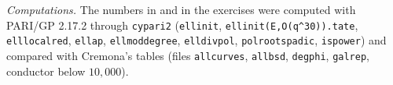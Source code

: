 \emph{Computations.} The numbers in  and in the exercises were computed with PARI/GP \cite{PARI}
2.17.2 through \texttt{cypari2} (\texttt{ellinit}, \texttt{ellinit(E,O(q\^{}30)).tate}, \texttt{elllocalred}, \texttt{ellap}, \texttt{ellmoddegree}, \texttt{elldivpol},
\texttt{polrootspadic}, \texttt{ispower}) and compared with Cremona's tables \cite{Cremona97} (files \texttt{allcurves}, \texttt{allbsd}, \texttt{degphi}, \texttt{galrep},
conductor below $10{,}000$).
